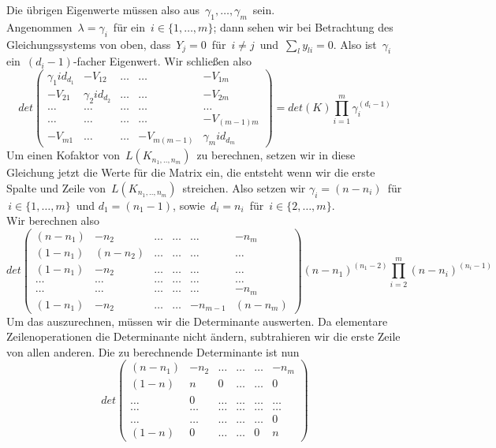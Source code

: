 Die übrigen Eigenwerte müssen also aus $\,\gamma_1,\ldots,\gamma_m\,$ sein.\\
Angenommen $\,\lambda=\gamma_i\,$ für ein $\,i\in\{1,\ldots,m\}$; dann sehen wir bei Betrachtung des Gleichungssystems von oben, dass $\,Y_j=0\,$ für $\,i\neq j\,$ und $\,\sum_ly_{li}=0$.\; 
Also ist $\,\gamma_i\,$ ein $\,(d_i-1)$-facher Eigenwert.
Wir schließen also
\begin{equation*}
{det
\begin{pmatrix}
 {\gamma_1}id_{d_1}&-V_{12}&\ldots&\ldots&-V_{1m}\\
 -V_{21}&{\gamma_2}id_{d_2}&\ldots&\ldots&-V_{2m}\\
 \ldots&\ldots&\ldots&\ldots&\ldots\\
  \ldots&\ldots&\ldots&\ldots&-V_{(m-1)m}\\
 -V_{m1}&\ldots&\ldots&-V_{m(m-1)}&{\gamma_m}id_{d_m}
\end{pmatrix}
}
={det(K)\prod_{i=1}^m \gamma_i^{(d_i -1)}}
\end{equation*}
Um einen Kofaktor von $\,L(K_{n_1,..,n_m})\,$ zu berechnen, setzen wir in diese Gleichung jetzt die Werte für die Matrix ein, die entsteht wenn wir die erste Spalte und Zeile von $\,L(K_{n_1,..,n_m})\,$ streichen. Also setzen wir 
$\gamma_i=(n-n_i)\,$ für $\,i\in\{1,\ldots,m\}\,$ und
$d_1=(n_1 -1)$,\;\; sowie $\,d_i=n_i\,$ für $\,i\in\{2,\ldots,m\}$.\; \\
Wir berechnen also
\begin{equation}
\label{vmp_1}
det
\begin{pmatrix}
 (n-n_1)&-n_2&\ldots&\ldots&\ldots&-n_m\\
 (1-n_1)&(n-n_2)&\ldots&\ldots&\ldots&\ldots\\
 (1-n_1)&-n_2&\ldots&\ldots&\ldots&\ldots\\
 \ldots&\ldots&\ldots&\ldots&\ldots&\ldots\\
 \ldots&\ldots&\ldots&\ldots&\ldots&-n_m\\
 (1-n_1)&-n_2&\ldots&\ldots&-n_{m-1}&(n-n_m)
\end{pmatrix}
(n-n_1)^{(n_1 -2)}\prod_{i=2}^m (n-n_i)^{(n_i -1)}
\end{equation}
Um das auszurechnen, müssen wir die Determinante auswerten. 
Da elementare Zeilenoperationen die Determinante nicht ändern, subtrahieren wir die erste Zeile von allen anderen. Die zu berechnende Determinante ist nun
\begin{equation*}
det
\begin{pmatrix}
 (n-n_1)&-n_2&\ldots&\ldots&\ldots&-n_m\\
 (1-n)&n&0&\ldots&\ldots&0\\
 \ldots&0&\ldots&\ldots&\ldots&\ldots\\
 \ldots&\ldots&\ldots&\ldots&\ldots&\ldots\\
 \ldots&\ldots&\ldots&\ldots&\ldots&0\\
 (1-n)&0&\ldots&\ldots&0&n
\end{pmatrix}
\end{equation*}
